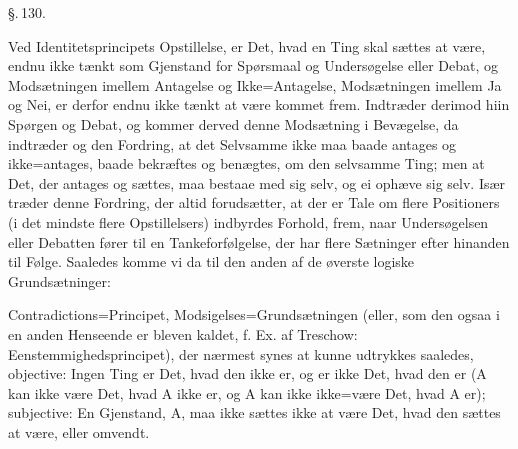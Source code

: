 \documentclass[12pt]{book}
\def\textit#1{#1}%
\def\emph#1{#1}%
\newcommand{\parag}[1]{%
  \par\vspace{0.9\baselineskip}%
  {\centering\textit{\S.\,#1.}\par}%
  \vspace{0.35\baselineskip}%
  \noindent\hspace{\parindent}\ignorespaces
}
\newcommand{\opage}[1]{\marginnote{\footnotesize\textit{[#1]}}}
\begin{document}
\parag{130}

Ved Identitetsprincipets Opstillelse, er Det, hvad en Ting skal sættes at være,
endnu ikke tænkt som Gjenstand for Spørsmaal og Undersøgelse eller Debat, og
Modsætningen imellem Antagelse og Ikke=Antagelse, Modsætningen imellem Ja og
Nei, er derfor endnu ikke tænkt at
\opage{315} være kommet frem. Indtræder derimod hiin Spørgen og Debat, og kommer derved
denne Modsætning i Bevægelse, da indtræder og den Fordring, at det Selvsamme
ikke maa baade antages og ikke=antages, baade bekræftes og benægtes, om den
selvsamme Ting; men at Det, der antages og sættes, maa bestaae med sig selv, og
ei ophæve sig selv. Især træder denne Fordring, der altid forudsætter, at der
er Tale om flere Positioners (i det mindste flere Opstillelsers) indbyrdes
Forhold, frem, naar Undersøgelsen eller Debatten fører til en Tankeforfølgelse,
der har flere Sætninger efter hinanden til Følge. Saaledes komme vi da til den
anden af de øverste logiske Grundsætninger:

\emph{Contradictions=Principet, Modsigelses=}Grundsætningen (eller, som den
ogsaa i en anden Henseende er bleven kaldet, f. Ex. af Treschow:
\emph{Eenstemmighedsprincipet}), der nærmest synes at kunne udtrykkes saaledes,
\emph{objective}: \emph{Ingen Ting er Det, hvad den ikke er, og er ikke Det,
hvad den er} (\textit{A} \emph{kan ikke være Det, hvad} \textit{A} \emph{ikke
er, og} \textit{A} \emph{kan ikke ikke=være Det, hvad} \textit{A} \emph{er});
\emph{subjective}: \emph{En Gjenstand,} \textit{A}, \emph{maa ikke sættes ikke
at være Det, hvad den sættes at være, eller omvendt.}
\end{document}
